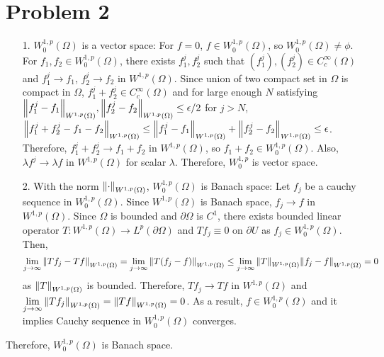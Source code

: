 \documentclass{article}
\begin{document}
\section*{Problem 2}
\begin{enumerate}
\item[1.] $W_0^{1,p}(\Omega)$ is a vector space: For $f=0$, $f\in W_0^{1,p}(\Omega)$, so $W_0^{1,p}(\Omega)\neq \phi$. For $f_1, f_2\in W_0^{1,p}(\Omega)$, there exists $f_1^j, f_2^j$ such that $(f_1^j), (f_2^j)\in C_c^\infty (\Omega)$ and $f_1^j\rightarrow f_1$, $f_2^j\rightarrow f_2$ in $W^{1,p}(\Omega)$. Since union of two compact set in $\Omega$ is compact in $\Omega$, $f_1^j+f_2^j\in C_c^\infty(\Omega)$ and for large enough $N$ satisfying $\norm{f_1^j-f_1}_{W^{1,p}(\Omega)} , \norm{f_2^j-f_2}_{W^{1,p}(\Omega)}\leq \epsilon/2$ for $j>N$, $\norm{f_1^j+f_2^j-f_1-f_2}_{W^{1,p}(\Omega)}\leq \norm{f_1^j-f_1}_{W^{1,p}(\Omega)}+\norm{f_2^j-f_2}_{W^{1,p}(\Omega)}\leq \epsilon$. Therefore, $f_1^j+f_2^j\rightarrow f_1+f_2$ in $W^{1,p}(\Omega)$, so $f_1+f_2\in W_0^{1,p}(\Omega)$. Also, $\lambda f^j\rightarrow \lambda f$ in $W^{1,p}(\Omega)$ for scalar $\lambda$. Therefore, $W_0^{1,p}$ is vector space.
\item[2.] With the norm $\norm{\cdot}_{W^{1,p}(\Omega)}$, ${W_0^{1,p}(\Omega)}$ is Banach space: Let $f_j$ be a cauchy sequence in ${W_0^{1,p}(\Omega)}$. Since ${W^{1,p}(\Omega)}$ is Banach space, $f_j\rightarrow f$ in $W^{1,p}(\Omega)$. Since $\Omega$ is bounded and $\partial \Omega$ is $C^1$, there exists bounded linear operator $T:{W^{1,p}(\Omega)}\rightarrow L^p(\partial \Omega)$ and $Tf_j\equiv 0$ on $\partial U$ as $f_j\in {W_0^{1,p}(\Omega)}$. Then,
\begin{equation*}
\lim\limits_{j\rightarrow\infty}\norm{Tf_j-Tf}_{W^{1,p}(\Omega)}=\lim\limits_{j\rightarrow\infty}\norm{T(f_j-f)}_{W^{1,p}(\Omega)}\leq \lim\limits_{j\rightarrow\infty}\norm{T}_{W^{1,p}(\Omega)}\norm{f_j-f}_{W^{1,p}(\Omega)}=0
\end{equation*}
as $\norm{T}_{W^{1,p}(\Omega)}$ is bounded. Therefore, $Tf_j\rightarrow Tf$ in $W^{1,p}(\Omega)$ and $\lim\limits_{j\rightarrow \infty}\norm{Tf_j}_{W^{1,p}(\Omega)}=\norm{Tf}_{W^{1,p}(\Omega)}=0$. As a result, $f\in W_0^{1,p}(\Omega)$ and it implies Cauchy sequence in ${W_0^{1,p}(\Omega)}$ converges.
\end{enumerate}
Therefore, $W_0^{1,p}(\Omega)$ is Banach space.
\end{document}
